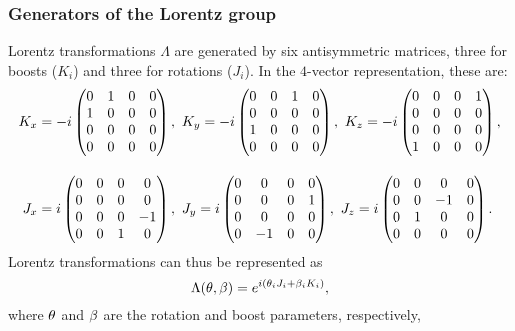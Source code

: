 \subsubsection{Generators of the Lorentz group}

Lorentz transformations $\Lambda$ are generated by six antisymmetric matrices, three for boosts ($K_i$) and three for rotations ($J_i$).
In the $4$-vector representation, these are:
\begin{equation}
	\begin{split}
	\label{eq:01_lorentz_generators}
	K_x &= -i\begin{pmatrix}
		\setlength{\arraycolsep}{10pt}
		0 & 1 & 0 & 0 \\
		1 & 0 & 0 & 0 \\
		0 & 0 & 0 & 0 \\
		0 & 0 & 0 & 0
	\end{pmatrix}, \
	K_y = -i\begin{pmatrix}
		0 & 0 & 1 & 0 \\
		0 & 0 & 0 & 0 \\
		1 & 0 & 0 & 0 \\
		0 & 0 & 0 & 0
	\end{pmatrix}, \
	K_z = -i\begin{pmatrix}
		0 & 0 & 0 & 1 \\
		0 & 0 & 0 & 0 \\
		0 & 0 & 0 & 0 \\
		1 & 0 & 0 & 0
	\end{pmatrix}, \\[1em]
	\setlength{\arraycolsep}{5pt}
	J_x &= i\begin{pmatrix}
		0 & 0 & 0 & 0 \\
		0 & 0 & 0 & 0 \\
		0 & 0 & 0 & -1 \\
		0 & 0 & 1 & 0
	\end{pmatrix}, \
	J_y = i\begin{pmatrix}
		0 & 0 & 0 & 0 \\
		0 & 0 & 0 & 1 \\
		0 & 0 & 0 & 0 \\
		0 & -1 & 0 & 0
	\end{pmatrix}, \
	J_z = i\begin{pmatrix}
		0 & 0 & 0 & 0 \\
		0 & 0 & -1 & 0 \\
		0 & 1 & 0 & 0 \\
		0 & 0 & 0 & 0
	\end{pmatrix}.
\end{split}
\end{equation}
Lorentz transformations can thus be represented as
\begin{equation}
	\label{eq:01_lorentz_generators_exponential}
\Lambda(\mathbf{\theta}, \mathbf{\beta}) = e^{i(\theta_i J_i + \beta_i K_i)},
\end{equation}
where $\mathbf{\theta}$ and $\mathbf{\beta}$ are the rotation and boost parameters, respectively,

